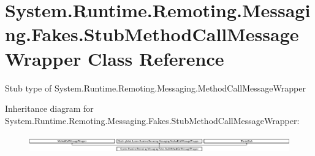\hypertarget{class_system_1_1_runtime_1_1_remoting_1_1_messaging_1_1_fakes_1_1_stub_method_call_message_wrapper}{\section{System.\-Runtime.\-Remoting.\-Messaging.\-Fakes.\-Stub\-Method\-Call\-Message\-Wrapper Class Reference}
\label{class_system_1_1_runtime_1_1_remoting_1_1_messaging_1_1_fakes_1_1_stub_method_call_message_wrapper}
}


Stub type of System.\-Runtime.\-Remoting.\-Messaging.\-Method\-Call\-Message\-Wrapper 


Inheritance diagram for System.\-Runtime.\-Remoting.\-Messaging.\-Fakes.\-Stub\-Method\-Call\-Message\-Wrapper\-:\begin{figure}[H]
\begin{center}
\leavevmode
\includegraphics[height=0.768176cm]{class_system_1_1_runtime_1_1_remoting_1_1_messaging_1_1_fakes_1_1_stub_method_call_message_wrapper}
\end{center}
\end{figure}
